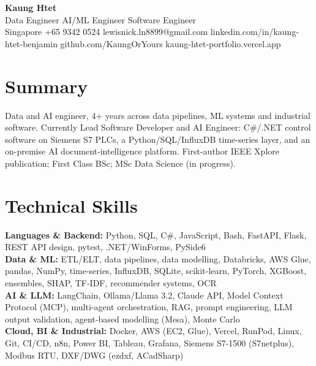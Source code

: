 \documentclass[letterpaper,10pt]{article}
\begin{document}
\fontsize{9.2}{10.5}\selectfont

\begin{center}
{\LARGE\bfseries Kaung Htet}\\[2pt]
Data Engineer \textbar{} AI/ML Engineer \textbar{} Software Engineer\\[1pt]
Singapore \textbar{} +65 9342 0524 \textbar{} lewisnick.ln8899@gmail.com \textbar{}
linkedin.com/in/kaung-htet-benjamin \textbar{} github.com/KaungOrYours \textbar{}
kaung-htet-portfolio.vercel.app
\end{center}

\section*{Summary}
Data and AI engineer, 4+ years across data pipelines, ML systems and industrial software.
Currently Lead Software Developer and AI Engineer: C\#/.NET control software on Siemens S7
PLCs, a Python/SQL/InfluxDB time-series layer, and an on-premise AI document-intelligence
platform. First-author IEEE Xplore publication; First Class BSc; MSc Data Science (in progress).

\section*{Technical Skills}
\textbf{Languages \& Backend:} Python, SQL, C\#, JavaScript, Bash, FastAPI, Flask, REST API
design, pytest, .NET/WinForms, PySide6\\
\textbf{Data \& ML:} ETL/ELT, data pipelines, data modelling, Databricks, AWS Glue, pandas,
NumPy, time-series, InfluxDB, SQLite, scikit-learn, PyTorch, XGBoost, ensembles, SHAP, TF-IDF,
recommender systems, OCR\\
\textbf{AI \& LLM:} LangChain, Ollama/Llama 3.2, Claude API, Model Context Protocol (MCP),
multi-agent orchestration, RAG, prompt engineering, LLM output validation, agent-based
modelling (Mesa), Monte Carlo\\
\textbf{Cloud, BI \& Industrial:} Docker, AWS (EC2, Glue), Vercel, RunPod, Linux, Git, CI/CD,
n8n, Power BI, Tableau, Grafana, Siemens S7-1500 (S7netplus), Modbus RTU, DXF/DWG (ezdxf,
ACadSharp)

\end{document}
